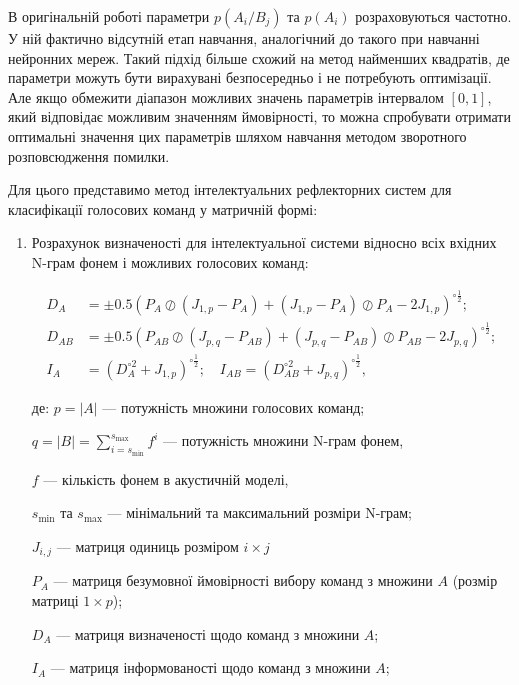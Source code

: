 В оригінальній роботі\cite{Teslia_2014} параметри $p(A_i/B_j)$ та $p(A_i)$ розраховуються частотно. У ній фактично відсутній етап навчання, аналогічний до такого при навчанні нейронних мереж. Такий підхід більше схожий на метод найменших квадратів, де параметри можуть бути вирахувані безпосередньо і не потребують оптимізації.
Але якщо обмежити діапазон можливих значень параметрів інтервалом $[0, 1]$, який відповідає можливим значенням ймовірності, то можна спробувати отримати оптимальні значення цих параметрів шляхом навчання методом зворотного розповсюдження помилки.

Для цього представимо метод інтелектуальних рефлекторних систем для класифікації голосових команд у матричній формі:

\begin{enumerate}
	\item Розрахунок визначеності для інтелектуальної системи відносно всіх вхідних N-грам фонем і можливих голосових команд:
	
	\begin{align}
		D_A&=\pm0.5(P_{A}\oslash(J_{1,p}-P_{A}) + (J_{1,p}-P_{A})\oslash P_{A} -2J_{1,p})^{\circ \frac{1}{2}}; \nonumber \\
		D_{AB}&=\pm0.5(P_{AB}\oslash(J_{p,q}-P_{AB}) + (J_{p,q}-P_{AB})\oslash P_{AB}-2J_{p,q})^{\circ \frac{1}{2}}; \nonumber \\
		I_A&=(D_A^{\circ 2}+J_{1,p})^{\circ \frac{1}{2}};\quad I_{AB}=(D_{AB}^{\circ 2}+J_{p,q})^{\circ \frac{1}{2}}, \nonumber
	\end{align}
	
	де: $p=|A|$ --- потужність множини голосових команд;
	
	{\settowidth{\leftskip}{де:\ }
		
		$q=|B|=\sum_{i=s_{\text{min}}}^{s_{\text{max}}}f^i$ --- потужність множини N-грам фонем,
		
		$f$ --- кількість фонем в акустичній моделі,
		
		$s_{\text{min}}$ та $s_{\text{max}}$ --- мінімальний та максимальний розміри N-грам;
		
		$J_{i,j}$ --- матриця одиниць розміром $i\times j$
		
		$P_{A}$ --- матриця безумовної ймовірності вибору команд з множини $A$ (розмір матриці $1\times p$); 
		
		$D_A$ --- матриця визначеності щодо команд з множини $A$; 
		
		$I_A$ --- матриця інформованості щодо команд з множини $A$; 
		
}
\end{enumerate}
